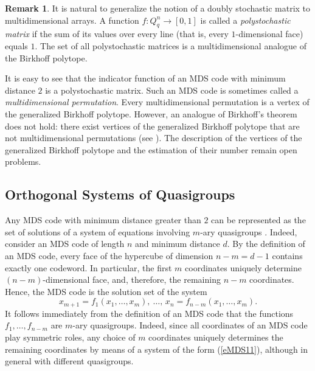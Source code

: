 \documentclass[11pt]{article}
\theoremstyle{definition}
\newtheorem{remark}{Remark}[section]
\begin{document}
{{{\begin{remark}
It is natural to generalize the notion of a doubly stochastic matrix to
multidimensional arrays. A function
$f:Q_q^n\rightarrow[0,1]$
is called a {\sl polystochastic matrix} if the sum of its values over
every line (that is, every $1$-dimensional face) equals $1$. The set
of all polystochastic matrices is a multidimensional analogue of the
Birkhoff polytope.

It is easy to see that the indicator function of an MDS code with
minimum distance $2$ is a polystochastic matrix. Such an MDS code is
sometimes called a {\sl multidimensional permutation}. Every
multidimensional permutation is a vertex of the generalized Birkhoff
polytope. However, an analogue of Birkhoff's theorem does not hold:
there exist vertices of the generalized Birkhoff polytope that are not
multidimensional permutations (see \cite{LL14,PotTar}). The
description of the vertices of the generalized Birkhoff polytope and
the estimation of their number remain open problems.\label{Berprob}
\end{remark}



\subsection{Orthogonal Systems of Quasigroups}

Any {\rm MDS} code with minimum distance greater than $2$ can be
represented as the set of solutions of a system of equations involving
$m$-ary quasigroups \cite{EMull}. Indeed, consider an {\rm MDS} code of
length $n$ and minimum distance $d$. By the definition of an {\rm MDS}
code, every face of the hypercube of dimension
$n-m=d-1$
contains exactly one codeword. In particular, the first $m$
coordinates uniquely determine $(n-m)$-dimensional face, and, therefore,  the remaining $n-m$ coordinates.
Hence, the {\rm MDS} code is the solution set of the system
\begin{equation}\label{eMDS11}
x_{m+1}=f_1(x_1,\dots,x_m),\ \dots,\,
x_n=f_{n-m}(x_1,\dots,x_m).
\end{equation}
It follows immediately from the definition of an {\rm MDS} code that
the functions $f_1,\dots,f_{n-m}$ are $m$-ary quasigroups. Indeed, since all
coordinates of an MDS code play symmetric roles, any choice of $m$ coordinates
uniquely determines the remaining coordinates by means of a system of
the form (\ref{eMDS11}), although in general with different
quasigroups.

}}}
\end{document}
